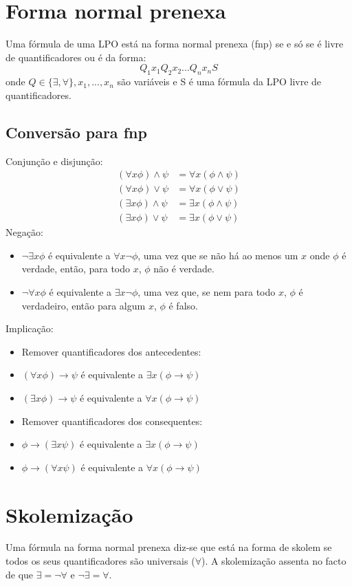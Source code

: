 \documentclass[10pt,a4paper]{report}
\begin{document}
\section{Forma normal prenexa}
Uma fórmula de uma LPO está na forma normal prenexa (fnp) se e só
se é livre de quantificadores ou é da forma:
$$
Q_1x_1Q_2x_2...Q_nx_nS
$$
onde $Q \in \{\exists, \forall\}, x_1, ..., x_n$ são variáveis e S é uma fórmula da LPO livre
de quantificadores.
\subsection{Conversão para fnp}
Conjunção e disjunção:
\begin{align}
(\forall x \phi) \land \psi& = \forall x(\phi \land \psi)\\
(\forall x \phi) \lor \psi& = \forall x (\phi \lor \psi)\\
(\exists x \phi) \land \psi& = \exists x(\phi \land \psi)\\
(\exists x \phi) \lor \psi& = \exists x (\phi \lor \psi)
\end{align}
Negação:
\begin{itemize}
\item $\neg \exists x \phi$ é equivalente a $\forall x \neg \phi$, uma vez que se não há ao menos um $x$ onde $\phi$ é verdade, então, para todo $x$, $\phi$ não é verdade.
\item $\neg \forall x \phi$ é equivalente a $\exists x \neg \phi$, uma vez que, se nem para todo $x$, $\phi$ é verdadeiro, então para algum $x$, $\phi$ é falso.
\end{itemize}
Implicação:
\begin{itemize}
\item[] Remover quantificadores dos antecedentes:
\item $(\forall x \phi) \rightarrow \psi$ é equivalente a $\exists x (\phi \rightarrow \psi)$
\item $(\exists x \phi) \rightarrow \psi$ é equivalente a $\forall x (\phi \rightarrow \psi)$
\item[] Remover quantificadores dos consequentes:
\item $\phi \rightarrow (\exists x \psi)$ é equivalente a $\exists x (\phi \rightarrow \psi)$
\item $\phi \rightarrow (\forall x \psi)$ é equivalente a $\forall x (\phi \rightarrow \psi)$
\end{itemize}


\section{Skolemização}
Uma fórmula na forma normal prenexa diz-se que está na forma de skolem se todos os seus quantificadores são universais ($\forall$). A skolemização assenta no facto de que $\exists = \neg \forall$ e $\neg \exists = \forall$.
\end{document}
